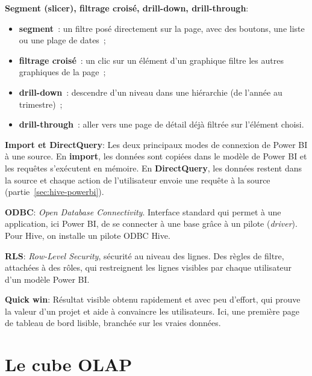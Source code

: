 \separateur

\noindent \textbf{Segment (slicer), filtrage croisé, drill-down, drill-through}:
\begin{itemize}
	\item \textbf{segment}~: un filtre posé directement sur la page, avec des boutons, une liste ou une plage de dates~;
	\item \textbf{filtrage croisé}~: un clic sur un élément d'un graphique filtre les autres graphiques de la page~;
	\item \textbf{drill-down}~: descendre d'un niveau dans une hiérarchie (de l'année au trimestre)~;
	\item \textbf{drill-through}~: aller vers une page de détail déjà filtrée sur l'élément choisi.
\end{itemize}

\separateur

\noindent \textbf{Import et DirectQuery}:
\noindent Les deux principaux modes de connexion de Power BI à une source. En \textbf{import}, les données sont copiées dans le modèle de Power BI et les requêtes s'exécutent en mémoire. En \textbf{DirectQuery}, les données restent dans la source et chaque action de l'utilisateur envoie une requête à la source (partie~\ref{sec:hive-powerbi}).

\separateur

\noindent \textbf{ODBC}:
\noindent \textit{Open Database Connectivity}. Interface standard qui permet à une application, ici Power BI, de se connecter à une base grâce à un pilote (\textit{driver}). Pour Hive, on installe un pilote ODBC Hive.

\separateur

\noindent \textbf{RLS}:
\noindent \textit{Row-Level Security}, sécurité au niveau des lignes. Des règles de filtre, attachées à des rôles, qui restreignent les lignes visibles par chaque utilisateur d'un modèle Power BI.

\separateur

\noindent \textbf{Quick win}:
\noindent Résultat visible obtenu rapidement et avec peu d'effort, qui prouve la valeur d'un projet et aide à convaincre les utilisateurs. Ici, une première page de tableau de bord lisible, branchée sur les vraies données.

\section{Le cube OLAP}\label{sec:cube}

